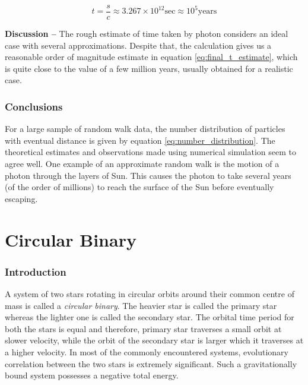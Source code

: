 \documentclass[a4paper]{article}
\begin{document}
\begin{enumerate} [label*=\textbf{(\alph*)}]
					\begin{equation}
					 	t = \frac{s}{c} \approx 3.267 \times 10^{12}_{} \text{sec} \approx 10^5 \text{years}
					 	\label{eq:final_t_estimate}
					\end{equation}
					
				\subitem \textbf{Discussion --}
					The rough estimate of time taken by photon considers an ideal case with several approximations. Despite that, the calculation gives us a reasonable order of magnitude estimate in equation \ref{eq:final_t_estimate}, which is quite close to the value of a few million years, usually obtained for a realistic case.
			
		\end{enumerate}

		
		\section{Conclusions} \label{1:conclusions}
		
		For a large sample of random walk data, the number distribution of particles with eventual distance is given by equation \ref{eq:number_distribution}. The theoretical estimates and observations made using numerical simulation seem to agree well. One example of an approximate random walk is the motion of a photon through the layers of Sun. This causes the photon to take several years (of the order of millions) to reach the surface of the Sun before eventually escaping.  
		

	
	
	\setcounter{section}{0}
	\part{Circular Binary} \label{Problem2}
	

		\section{Introduction} \label{2:introduction}
		A system of two stars rotating in circular orbits around their common centre of mass is called a \emph{circular binary}. The heavier star is called the primary star whereas the lighter one is called the secondary star. The orbital time period for both the stars is equal and therefore, primary star traverses a small orbit at slower velocity, while the orbit of the secondary star is larger which it traverses at a higher velocity. In most of the commonly encountered systems, evolutionary correlation between the two stars is extremely significant. Such a gravitationally bound system possesses a negative total energy.
\end{document}

